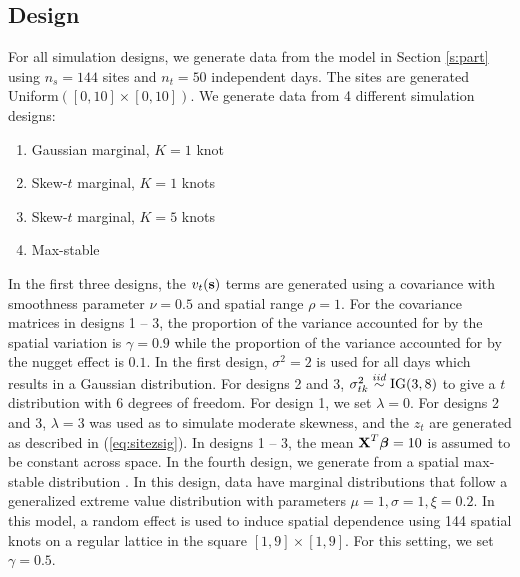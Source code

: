 \documentclass[11pt]{article}
\begin{document}
\subsection{Design}\label{s:simdesign}
For all simulation designs, we generate data from the model in Section \ref{s:part} using $n_s=144$ sites and $n_t=50$ independent days.
The sites are generated Uniform$([0, 10] \times [0, 10])$.
We generate data from 4 different simulation designs:
\begin{enumerate} \setlength{\itemsep}{-0.5em}
  \item Gaussian marginal, $K=1$ knot
  \item Skew-$t$ marginal, $K=1$ knots
  \item Skew-$t$ marginal, $K=5$ knots
  \item Max-stable
\end{enumerate}
In the first three designs, the $v_t(\mbox{\bf s})$ terms are generated using a \Matern covariance with smoothness parameter $\nu = 0.5$ and spatial range $\rho = 1$.
For the covariance matrices in designs 1 -- 3, the proportion of the variance accounted for by the spatial variation is $\gamma = 0.9$ while the proportion of the variance accounted for by the nugget effect is $0.1$.
In the first design, $\sigma^2 = 2$ is used for all days which results in a Gaussian distribution.
For designs 2 and 3, $\sigma^2_{tk} \stackrel{iid}{\sim} \text{IG}(3, 8)$ to give a $t$ distribution with 6 degrees of freedom.
For design 1, we set $\lambda = 0$.
For designs 2 and 3, $\lambda = 3$ was used as to simulate moderate skewness, and the $z_t$ are generated as described in (\ref{eq:sitezsig}).
In designs 1 -- 3, the mean $\mbox{\bf X}^T \mbox{\boldmath $\beta$} = 10$ is assumed to be constant across space.
In the fourth design, we generate from a spatial max-stable distribution \citep{Reich2012}.
In this design, data have marginal distributions that follow a generalized extreme value distribution with parameters $\mu = 1, \sigma=1, \xi=0.2$.
In this model, a random effect is used to induce spatial dependence using 144 spatial knots on a regular lattice in the square $[1, 9] \times [1, 9]$.
For this setting, we set $\gamma = 0.5$.
\end{document}
